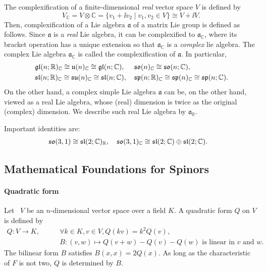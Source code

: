 \documentclass[CheatSheet]{subfiles}
\begin{document}
The complexification of a finite-dimensional \emph{real} vector space $V$ is defined by
\begin{equation}
 V_{\mathbb C}=V\otimes\mathbb C=\{v_1+\ii v_2\mathbin|v_1,v_2\in V\}\cong V+\ii V.
\end{equation}
Then, complexification of a Lie algebra $\mathfrak a$ of a matrix Lie group is defined as follows.
Since $\mathfrak a$ is a \emph{real} Lie algebra, it can be complexified to $\mathfrak a_{\mathbb C}$, where its bracket operation has a unique extension so that $\mathfrak a_{\mathbb C}$ is a \emph{complex} lie algebra.
The complex Lie algebra $\mathfrak a_{\mathbb C}$ is called the complexification of $\mathfrak a$.
In particular,
\begin{align}\notag
 &
 \mathop{\mathfrak{gl}}(n;\mathbb R)_{\mathbb C}
 \cong \mathop{\mathfrak{u}}(n)_{\mathbb C}
 \cong \mathop{\mathfrak{gl}}(n;\mathbb C),&
 &
 \mathop{\mathfrak{so}}(n)_{\mathbb C}
 \cong \mathop{\mathfrak{so}}(n;\mathbb C),\\
 &
 \mathop{\mathfrak{sl}}(n;\mathbb R)_{\mathbb C}
 \cong \mathop{\mathfrak{su}}(n)_{\mathbb C}
 \cong \mathop{\mathfrak{sl}}(n;\mathbb C),&
 &
 \mathop{\mathfrak{sp}}(n;\mathbb R)_{\mathbb C}
 \cong \mathop{\mathfrak{sp}}(n)_{\mathbb C}
 \cong \mathop{\mathfrak{sp}}(n;\mathbb C).
\end{align}
On the other hand, a complex simple Lie algebra $\mathfrak a$ can be, on the other hand, viewed as a real Lie algebra, whose (real) dimension is twice as the original (complex) dimension.
We describe such real Lie algebra by $\mathfrak a_{\mathbb R}$.

Important identities are:
\begin{align}
 &\operatorname{\mathfrak{so}}(3,1)\cong \operatorname{\mathfrak{sl}}(2;\mathbb C)_{\mathbb R},&
 &\operatorname{\mathfrak{so}}(3,1)_{\mathbb C}\cong \operatorname{\mathfrak{sl}}(2;\mathbb C)\oplus\operatorname{\mathfrak{sl}}(2;\mathbb C).
\end{align}


\subsection{Mathematical Foundations for Spinors}
\paragraph{Quadratic form}
Let~\cite[\S6.3]{Jacobson} $V$ be an $n$-dimensional vector space over a field $K$. A quadratic form $Q$ on $V$ is defined by
\begin{equation}
\begin{split}
   Q\colon V\to K,\qquad
   &\forall k\in K, v\in V, Q(k v)=k^2Q(v),\\
   &B\colon (v,w)\mapsto Q(v+w)-Q(v)-Q(w)\text{~is linear in $v$ and $w$.}
\end{split}
\end{equation}
The bilinear form $B$ satisfies $B(x,x)=2Q(x)$. As long as the characteristic of $F$ is not two, $Q$ is determined by $B$.
\end{document}
